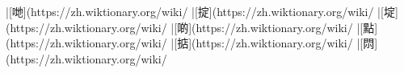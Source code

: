 |[哋](https://zh.wiktionary.org/wiki/%
|[掟](https://zh.wiktionary.org/wiki/%
|[埞](https://zh.wiktionary.org/wiki/%
|[啲](https://zh.wiktionary.org/wiki/%
|[點](https://zh.wiktionary.org/wiki/%
|[掂](https://zh.wiktionary.org/wiki/%
|[𨳒](https://zh.wiktionary.org/wiki/%
